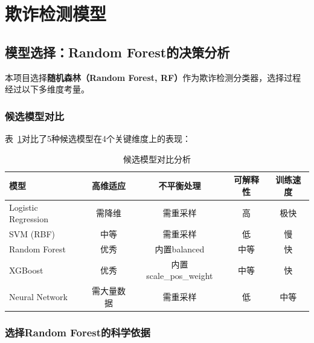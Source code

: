 \documentclass[12pt,a4paper]{article}
\begin{document}
\section{欺诈检测模型}

\subsection{模型选择：Random Forest的决策分析}

本项目选择\textbf{随机森林（Random Forest, RF）}作为欺诈检测分类器，选择过程经过以下多维度考量。

\subsubsection{候选模型对比}

表~\ref{tab:model-compare}对比了5种候选模型在4个关键维度上的表现：

\begin{table}[H]
\centering
\caption{候选模型对比分析}
\label{tab:model-compare}
\begin{tabular}{@{}lcccc@{}}
\toprule
\textbf{模型} & \textbf{高维适应} & \textbf{不平衡处理} & \textbf{可解释性} & \textbf{训练速度} \\
\midrule
Logistic Regression & 需降维 & 需重采样 & 高 & 极快 \\
SVM (RBF) & 中等 & 需重采样 & 低 & 慢 \\
Random Forest & 优秀 & 内置balanced & 中等 & 快 \\
XGBoost & 优秀 & 内置scale\_pos\_weight & 中等 & 快 \\
Neural Network & 需大量数据 & 需重采样 & 低 & 中等 \\
\bottomrule
\end{tabular}
\end{table}

\subsubsection{选择Random Forest的科学依据}
\end{document}

